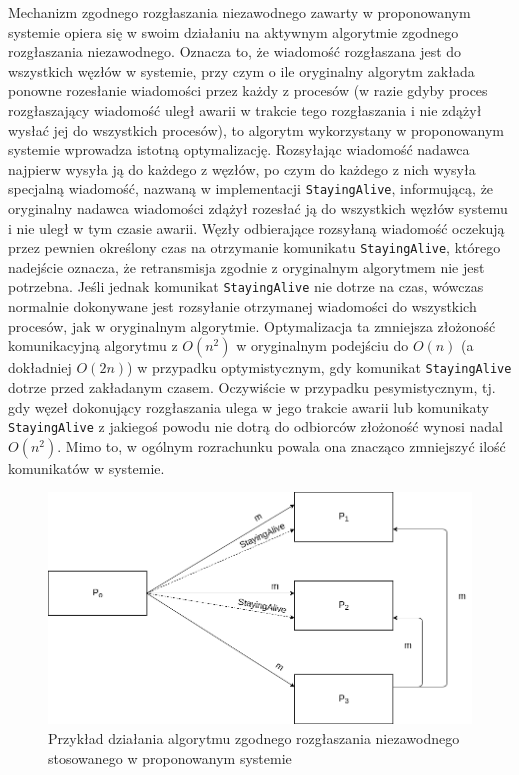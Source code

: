 Mechanizm zgodnego rozgłaszania niezawodnego zawarty w proponowanym systemie opiera się w swoim działaniu na aktywnym algorytmie zgodnego rozgłaszania niezawodnego. Oznacza to, że wiadomość rozgłaszana jest do wszystkich węzłów w systemie, przy czym o ile oryginalny algorytm zakłada ponowne rozesłanie wiadomości przez każdy z procesów (w razie gdyby proces rozgłaszający wiadomość uległ awarii w trakcie tego rozgłaszania i nie zdążył wysłać jej do wszystkich procesów), to algorytm wykorzystany w proponowanym systemie wprowadza istotną optymalizację. Rozsyłając wiadomość nadawca najpierw wysyła ją do każdego z węzłów, po czym do każdego z nich wysyła specjalną wiadomość, nazwaną w implementacji \texttt{StayingAlive}, informującą, że oryginalny nadawca wiadomości zdążył rozesłać ją do wszystkich węzłów systemu i nie uległ w tym czasie awarii. Węzły odbierające rozsyłaną wiadomość oczekują przez pewnien określony czas na otrzymanie komunikatu \texttt{StayingAlive}, którego nadejście oznacza, że retransmisja zgodnie z oryginalnym algorytmem nie jest potrzebna. Jeśli jednak komunikat \texttt{StayingAlive} nie dotrze na czas, wówczas normalnie dokonywane jest rozsyłanie otrzymanej wiadomości do wszystkich procesów, jak w oryginalnym algorytmie. Optymalizacja ta zmniejsza złożoność komunikacyjną algorytmu z $ O(n^2) $ w oryginalnym podejściu do $ O(n) $ (a dokładniej $ O(2n) $) w przypadku optymistycznym, gdy komunikat \texttt{StayingAlive} dotrze przed zakładanym czasem. Oczywiście w przypadku pesymistycznym, tj. gdy węzeł dokonujący rozgłaszania ulega w jego trakcie awarii lub komunikaty \texttt{StayingAlive} z jakiegoś powodu nie dotrą do odbiorców złożoność wynosi nadal $ O(n^2) $. Mimo to, w ogólnym rozrachunku powala ona znacząco zmniejszyć ilość komunikatów w systemie.

\begin{figure}[h!]
    \includegraphics[width=\linewidth]{images/04-FIFO_RRB.png}
    \caption{Przykład działania algorytmu zgodnego rozgłaszania niezawodnego stosowanego w proponowanym systemie}
    \label{figure:systemdescription_fifo_rrb}
\end{figure}

